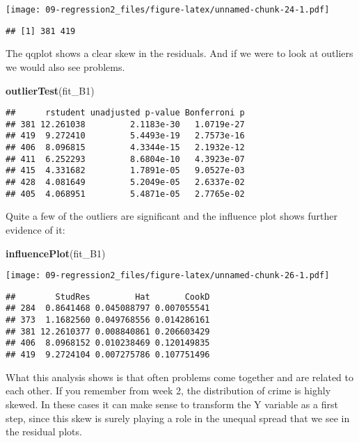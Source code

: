 \documentclass[
]{book}
\newenvironment{Shaded}{\begin{snugshade}}{\end{snugshade}}
\newcommand{\FunctionTok}[1]{\textcolor[rgb]{0.13,0.29,0.53}{\textbf{#1}}}
\newcommand{\NormalTok}[1]{#1}
\begin{document}
\texttt{[image: 09-regression2\_files/figure-latex/unnamed-chunk-24-1.pdf]}

\begin{verbatim}
## [1] 381 419
\end{verbatim}

The qqplot shows a clear skew in the residuals. And if we were to look at outliers we would also see problems.

\begin{Shaded}
\begin{Highlighting}[]
\FunctionTok{outlierTest}\NormalTok{(fit\_B1)}
\end{Highlighting}
\end{Shaded}

\begin{verbatim}
##      rstudent unadjusted p-value Bonferroni p
## 381 12.261038         2.1183e-30   1.0719e-27
## 419  9.272410         5.4493e-19   2.7573e-16
## 406  8.096815         4.3344e-15   2.1932e-12
## 411  6.252293         8.6804e-10   4.3923e-07
## 415  4.331682         1.7891e-05   9.0527e-03
## 428  4.081649         5.2049e-05   2.6337e-02
## 405  4.068951         5.4871e-05   2.7765e-02
\end{verbatim}

Quite a few of the outliers are significant and the influence plot shows further evidence of it:

\begin{Shaded}
\begin{Highlighting}[]
\FunctionTok{influencePlot}\NormalTok{(fit\_B1)}
\end{Highlighting}
\end{Shaded}

\texttt{[image: 09-regression2\_files/figure-latex/unnamed-chunk-26-1.pdf]}

\begin{verbatim}
##        StudRes         Hat       CookD
## 284  0.8641468 0.045088797 0.007055541
## 373  1.1682560 0.049768556 0.014286161
## 381 12.2610377 0.008840861 0.206603429
## 406  8.0968152 0.010238469 0.120149835
## 419  9.2724104 0.007275786 0.107751496
\end{verbatim}

What this analysis shows is that often problems come together and are related to each other. If you remember from week 2, the distribution of crime is highly skewed. In these cases it can make sense to transform the Y variable as a first step, since this skew is surely playing a role in the unequal spread that we see in the residual plots.
\end{document}
